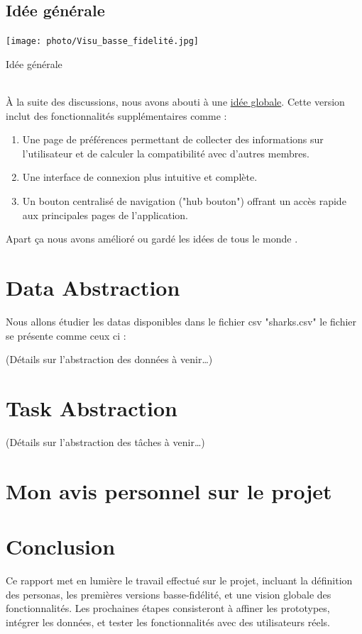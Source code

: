\documentclass{article}
\begin{document}
\subsection{Idée générale}
\texttt{[image: photo/Visu\_basse\_fidelité.jpg]}\caption{Idée générale}
\label{fig:général}
\vspace{1cm}\\
À la suite des discussions, nous avons abouti à une \hyperref[fig:général]{idée globale}. 
Cette version inclut des fonctionnalités supplémentaires comme :
\begin{enumerate}
    \item Une page de préférences permettant de collecter des informations sur l’utilisateur et de calculer la compatibilité avec d’autres membres.

    \item Une interface de connexion plus intuitive et complète.

    \item Un bouton centralisé de navigation ("hub bouton") offrant un accès rapide aux principales 
    pages de l’application.
\end{enumerate}
Apart ça nous avons amélioré ou gardé les idées de tous le monde . 

\newpage
\section{Data Abstraction}
\label{sec:data}
Nous allons étudier les datas disponibles dans le fichier csv "sharks.csv" le fichier se présente comme ceux ci :



(Détails sur l'abstraction des données à venir…)

\section{Task Abstraction}
(Détails sur l'abstraction des tâches à venir…)

\section{Mon avis personnel sur le projet }


\section{Conclusion}
Ce rapport met en lumière le travail effectué sur le projet, incluant la définition des personas, 
les premières versions basse-fidélité, et une vision globale des fonctionnalités. 
Les prochaines étapes consisteront à affiner les prototypes, intégrer les données, et tester 
les fonctionnalités avec des utilisateurs réels. 
\end{document}
